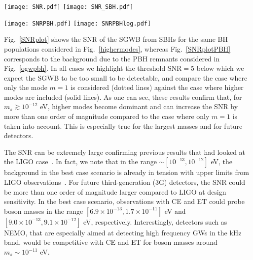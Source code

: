 \documentclass[
reprint,           %
superscriptaddress,%
amsmath,           %
amssymb,           %
aps,               %
prd,               %
notitlepage,       %
floatfix,          %
nofootinbib %
]{revtex4-1}
\begin{document}
\begin{figure*}[htbp!]
	\centering
	\texttt{[image: SNR.pdf]}
	\texttt{[image: SNR\_SBH.pdf]}
	\caption{\label{SNRplot} Left panel: SNR for the SGWB, as a function of the boson mass $m_s$, from stellar-origin BHs taking into account both isolated and remnant BHs and assuming a uniform initial spin distribution $\chi_i \in [0,1]$ for BHs formed in isolation. Right panel: SNR for the SGWB when only taking into account the contribution for BHs formed through the merger of stellar-origin BHs.
%
The dashed line corresponds to $\mathrm{SNR}=5$. For all the detectors, we assume an observation time $T=4$ yr.
Dotted lines only include the fundamental mode $m=1$ while solid lines include $m\geq 1$ with all the $m$ that contribute.
	}
\end{figure*}
\begin{figure*}[htbp!]
	\texttt{[image: SNRPBH.pdf]}
	\texttt{[image: SNRPBHlog.pdf]}
	\caption{\label{SNRplotPBH}Same as Fig.~\ref{SNRplot} but for the PBH remnant population. Left panel: The mass function of PBHs is $P(M)\propto M^{-3/2}$ in the mass window $M\in [1,5]\Msun$.
		Right panel: The mass function of PBHs has a log-normal form described by Eq.~(\ref{log}). We set $M_p=3\Msun$ and $\sigma=0.5$.
	}
\end{figure*}
Fig.~\ref{SNRplot} shows the SNR of the SGWB from SBHs for the same BH populations considered in Fig.~\ref{highermodes}, whereas Fig.~\ref{SNRplotPBH}  corresponds to the background due to the PBH remnants considered in Fig.~\ref{ogwpbh}. In all cases we highlight the threshold SNR$=5$ below which we expect the SGWB to be too small to be detectable, and compare the case where only the mode $m=1$ is considered (dotted lines) against the case where higher modes are included (solid lines). As one can see, these results confirm that, for $m_s \gtrsim 10^{-12}$ eV, higher modes become dominant and can increase the SNR by more than one order of magnitude compared to the case where only $m=1$ is taken into account. This is especially true for the largest masses and for future detectors.
%

The SNR can be extremely large confirming previous results that had looked at the LIGO case~\cite{Brito:2017wnc,Tsukada:2018mbp,Tsukada:2020lgt}. In fact, we note that in the range $\sim [10^{-13},10^{-12}]$ eV, the background in the best case scenario is already in tension with upper limits from LIGO observations~\cite{Brito:2017wnc,Tsukada:2018mbp,Tsukada:2020lgt}. For future third-generation (3G) detectors, the SNR could be more than one order of magnitude larger compared to LIGO at design sensitivity. In the best case scenario, observations with CE and ET could probe boson masses in the range $[6.9\times10^{-13},1.7\times 10^{-11}]$ eV and $[9.0\times10^{-13},9.1\times10^{-12}]$ eV, respectively. Interestingly, detectors such as NEMO, that are especially aimed at detecting high frequency GWs in the kHz band, would be competitive with CE and ET for boson masses around $m_s\sim 10^{-11}$ eV.
%
\end{document}
